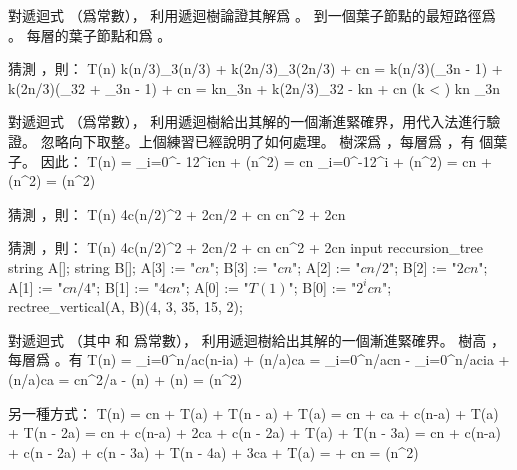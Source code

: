 \startEXERCISE
對遞迴式 （爲常數），
利用遞迴樹論證其解爲 。
\stopEXERCISE
\startANSWER
到一個葉子節點的最短路徑爲 。
每層的葉子節點和爲 。

猜測 ，則：
\startformula\startmathalignment[n=3]
\NC T(n) \NC \ge k(n/3)\log_3(n/3) + k(2n/3)\log_3{(2n/3)} + cn \NC \NR
\NC      \NC = k(n/3)(\log_3{n} - 1) + k(2n/3)(\log_3{2} + \log_3{n} - 1) + cn \NC \NR
\NC      \NC = kn\log_3{n} + k(2n/3)\log_3{2} - kn + cn \NC (k < ) \NR
\NC      \NC \ge kn \log_3{n} \NC \NR
\stopmathalignment\stopformula
\stopANSWER

\startEXERCISE
對遞迴式  （爲常數），
利用遞迴樹給出其解的一個漸進緊確界，用代入法進行驗證。
\stopEXERCISE
\startANSWER
忽略向下取整。上個練習已經說明了如何處理。
樹深爲 ，每層爲 ，有  個葉子。
因此：
\startformula\startmathalignment
\NC T(n) \NC = \sum_{i=0}^{- 1}2^icn + \Theta(n^2) \NR
\NC      \NC = cn \sum_{i=0}^{-1}2^i + \Theta(n^2) \NR
\NC      \NC = cn  + \Theta(n^2) \NR
\NC      \NC = \Theta(n^2) \NR
\stopmathalignment\stopformula

猜測 ，則：
\startformula
T(n) \le 4c(n/2)^2 + 2cn/2 + cn
        \le cn^2 + 2cn
\stopformula

猜測 ，則：
\startformula
T(n) \ge 4c(n/2)^2 + 2cn/2 + cn
        \ge cn^2 + 2cn
\stopformula
	\startMPcode
		input reccursion_tree
		string A[];
		string B[];
		A[3] := "$cn$";		B[3] := "$cn$";
		A[2] := "$cn/2$";	B[2] := "$2cn$";
		A[1] := "$cn/4$";	B[1] := "$4cn$";
		A[0] := "$T(1)$";	B[0] := "$2^icn$";
		rectree_vertical(A, B)(4, 3, 35, 15, 2);
	\stopMPcode
\stopANSWER

\startEXERCISE
對遞迴式  （其中  和 爲常數），
利用遞迴樹給出其解的一個漸進緊確界。
\stopEXERCISE
\startANSWER
樹高 ，每層爲 。有
\startformula\startmathalignment
\NC T(n) \NC = \sum_{i=0}^{n/a}c(n-ia) + (n/a)ca \NR
\NC      \NC = \sum_{i=0}^{n/a}cn - \sum_{i=0}^{n/a}cia + (n/a)ca \NR
\NC      \NC = cn^2/a - \Theta(n) + \Theta(n) \NR
\NC      \NC = \Theta(n^2) \NR
\stopmathalignment\stopformula

另一種方式：
\startformula\startmathalignment
\NC T(n) \NC = cn + T(a) + T(n - a) + T(a) \NR
\NC      \NC = cn + ca + c(n-a) + T(a) + T(n - 2a) \NR
\NC      \NC = cn + c(n-a) + 2ca + c(n - 2a) + T(a) + T(n - 3a) \NR
\NC      \NC = cn + c(n-a) + c(n - 2a) + c(n - 3a) + T(n - 4a) + 3ca + T(a) \NR
\NC      \NC =  + cn \NR
\NC      \NC = \Theta(n^2) \NR
\stopmathalignment\stopformula

